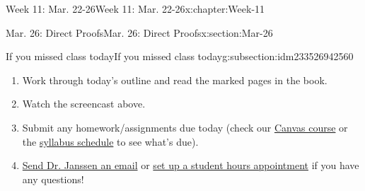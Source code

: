 \documentclass[oneside,10pt,]{book}
\numberwithin{equation}{section}
\begin{document}
\begin{chapterptx}{Week 11: Mar. 22-26}{}{Week 11: Mar. 22-26}{}{}{x:chapter:Week-11}
\begin{sectionptx}{Mar. 26: Direct Proofs}{}{Mar. 26: Direct Proofs}{}{}{x:section:Mar-26}
%
%
\typeout{************************************************}
\typeout{************************************************}
%
\begin{subsectionptx}{If you missed class today}{}{If you missed class today}{}{}{g:subsection:idm233526942560}
%
\begin{enumerate}
\item{}Work through today's outline and read the marked pages in the book.%
\item{}Watch the screencast above.%
\item{}Submit any homework\slash{}assignments due today (check our \href{https://dordt.instructure.com/courses/3110050}{Canvas course} or the \href{https://prof.mkjanssen.org/ds/index.html\#schedule}{syllabus schedule} to see what's due).%
\item{}\href{mailto:mike.janssen@dordt.edu}{Send Dr. Janssen an email} or \href{https://calendly.com/mkjanssen/student-hours}{set up a student hours appointment} if you have any questions!%
\end{enumerate}
\end{subsectionptx}
\end{sectionptx}
\end{chapterptx}
%
%
\typeout{************************************************}
\typeout{************************************************}
%
\end{document}
